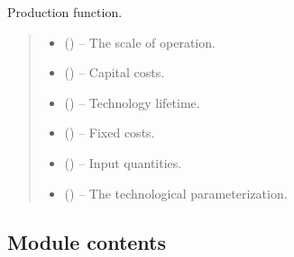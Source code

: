 \documentclass[letterpaper,10pt,english]{sphinxmanual}
\begin{document}
\begin{fulllineitems}
\label{\detokenize{technology:technology.tutorial_basic.production}}
\pysigstartsignatures
{}
\pysigstopsignatures
\sphinxAtStartPar
Production function.
\begin{quote}\begin{description}
\begin{itemize}
\item {} 
\sphinxAtStartPar
{} () – The scale of operation.

\item {} 
\sphinxAtStartPar
{} () – Capital costs.

\item {} 
\sphinxAtStartPar
{} () – Technology lifetime.

\item {} 
\sphinxAtStartPar
{} () – Fixed costs.

\item {} 
\sphinxAtStartPar
{} () – Input quantities.

\item {} 
\sphinxAtStartPar
{} () – The technological parameterization.

\end{itemize}

\end{description}\end{quote}

\end{fulllineitems}



\subsection{Module contents}
\label{\detokenize{technology:module-technology}}\label{\detokenize{technology:module-contents}}
\end{document}
